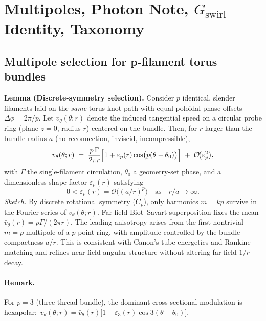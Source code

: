 \section{Multipoles, Photon Note, \texorpdfstring{\(G_{\text{swirl}}\)}{G_swirl} Identity, Taxonomy}

\subsection{Multipole selection for p-filament torus bundles \statusResearch}
    \textbf{Lemma (Discrete-symmetry selection).}
    Consider \(p\) identical, slender filaments laid on the \emph{same} torus-knot path with equal poloidal phase offsets \(\Delta\phi=2\pi/p\). Let \(v_\theta(\theta;r)\) denote the induced tangential speed on a circular probe ring (plane \(z=0\), radius \(r\)) centered on the bundle. Then, for \(r\) larger than the bundle radius \(a\) (no reconnection, inviscid, incompressible),
    \[
        v_\theta(\theta;r)\;=\;\frac{p\,\Gamma}{2\pi r}\Bigl[1+\varepsilon_p(r)\cos\!\big(p(\theta-\theta_0)\big)\Bigr]
        \;+\;\mathcal{O}\!\big(\varepsilon_p^2\big),
    \]
    with \(\Gamma\) the single-filament circulation, \(\theta_0\) a geometry-set phase, and a dimensionless shape factor \(\varepsilon_p(r)\) satisfying
    \[
        0<\varepsilon_p(r)=\mathcal{O}\!\big((a/r)^p\big)\quad\text{as}\quad r/a\to\infty.
    \]
    \emph{Sketch.} By discrete rotational symmetry (\(C_p\)), only harmonics \(m=kp\) survive in the Fourier series of \(v_\theta(\theta;r)\). Far-field Biot–Savart superposition fixes the mean \(\bar v_\theta(r)=p\Gamma/(2\pi r)\). The leading anisotropy arises from the first nontrivial \(m=p\) multipole of a \(p\)-point ring, with amplitude controlled by the bundle compactness \(a/r\). This is consistent with Canon’s tube energetics and Rankine matching and refines near-field angular structure without altering far-field \(1/r\) decay.

    \paragraph{Remark.}
        For \(p=3\) (three-thread bundle), the dominant cross-sectional modulation is hexapolar:
        \(\,v_\theta(\theta;r)=\bar v_\theta(r)\big[1+\varepsilon_3(r)\cos 3(\theta-\theta_0)\big]\).

